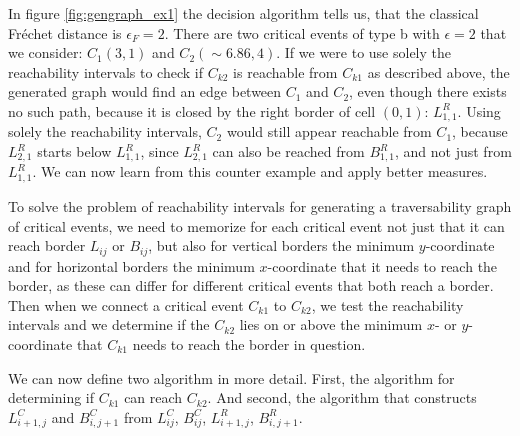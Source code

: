In figure \ref{fig:gengraph_ex1} the decision algorithm tells us, that the classical Fréchet distance is $\epsilon_F = 2$. There are two critical events of type b with $\epsilon = 2$ that we consider: $C_1(3, 1)$ and $C_2(\sim6.86, 4)$. If we were to use solely the reachability intervals to check if $C_{k2}$ is reachable from $C_{k1}$ as described above, the generated graph would find an edge between $C_1$ and $C_2$, even though there exists no such path, because it is closed by the right border of cell $(0, 1)$: $L_{1, 1}^R$. Using solely the reachability intervals, $C_2$ would still appear reachable from $C_1$, because $L_{2, 1}^R$ starts below $L_{1, 1}^R$, since $L_{2, 1}^R$ can also be reached from $B_{1,1}^R$, and not just from $L_{1, 1}^R$. We can now learn from this counter example and apply better measures.

To solve the problem of reachability intervals for generating a traversability graph of critical events, we need to memorize for each critical event not just that it can reach border $L_{ij}$ or $B_{ij}$, but also for vertical borders the minimum $y$-coordinate and for horizontal borders the minimum $x$-coordinate that it needs to reach the border, as these can differ for different critical events that both reach a border. Then when we connect a critical event $C_{k1}$ to $C_{k2}$, we test the reachability intervals and we determine if the $C_{k2}$ lies on or above the minimum $x$- or $y$-coordinate that $C_{k1}$ needs to reach the border in question.

We can now define two algorithm in more detail. First, the algorithm for determining if $C_{k1}$ can reach $C_{k2}$. And second, the algorithm that constructs $L_{i+1, j}^C$ and $B_{i, j+1}^C$ from $L_{ij}^C$, $B_{ij}^C$, $L_{i+1, j}^R$, $B_{i, j+1}^R$.

